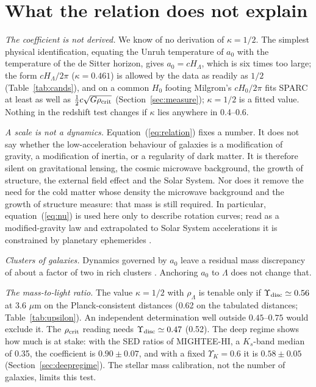 \documentclass[fleqn,usenatbib]{mnras}
\newif\ifpapersix
\begin{document}
\section{What the relation does not explain}
\label{sec:limits}
\emph{The coefficient is not derived.} We know of no derivation of $\kappa=1/2$. The simplest physical identification, equating the Unruh temperature of $a_0$ with the temperature of the de Sitter horizon, gives $a_0=cH_\Lambda$, which is six times too large; the form $cH_\Lambda/2\pi$ ($\kappa=0.461$) is allowed by the data as readily as $1/2$ (Table~\ref{tab:cands}), and on a common $H_0$ footing Milgrom's $cH_0/2\pi$ fits SPARC at least as well as $\tfrac12c\sqrt{G\rho_{\rm crit}}$ (Section~\ref{sec:measure}); $\kappa=1/2$ is a fitted value. \ifpapersix A separate analysis finds that, in the aether--scalar class of local relativistic actions it examined, the additive constant of the MOND Lagrangian is degenerate with $\Lambda$, so those actions do not fix the coefficient \citep[its four-form section is superseded]{Zimmerman2026kappa}. \fi Nothing in the redshift test changes if $\kappa$ lies anywhere in 0.4--0.6.

\emph{A scale is not a dynamics.} Equation~(\ref{eq:relation}) fixes a number. It does not say whether the low-acceleration behaviour of galaxies is a modification of gravity, a modification of inertia, or a regularity of dark matter. It is therefore silent on gravitational lensing, the cosmic microwave background, the growth of structure, the external field effect \citep{Chae2020} and the Solar System. Nor does it remove the need for the cold matter whose density the microwave background and the growth of structure measure: that mass is still required. In particular, equation~(\ref{eq:nu}) is used here only to describe rotation curves; read as a modified-gravity law and extrapolated to Solar System accelerations it is constrained by planetary ephemerides \citep{Hees2016}.

\emph{Clusters of galaxies.} Dynamics governed by $a_0$ leave a residual mass discrepancy of about a factor of two in rich clusters \citep{SandersMcGaugh2002,FamaeyMcGaugh2012}. Anchoring $a_0$ to $\Lambda$ does not change that.

\emph{The mass-to-light ratio.} The value $\kappa=1/2$ with $\rho_\Lambda$ is tenable only if $\Upsilon_{\rm disc}\simeq0.56$ at 3.6 $\mu$m on the Planck-consistent distances (0.62 on the tabulated distances; Table~\ref{tab:upsilon}). An independent determination well outside $0.45$--$0.75$ would exclude it. The $\rho_{\rm crit}$ reading needs $\Upsilon_{\rm disc}\simeq0.47$ (0.52). The deep regime shows how much is at stake: with the SED ratios of MIGHTEE-HI, a $K_s$-band median of 0.35, the coefficient is $0.90\pm0.07$, and with a fixed $\Upsilon_K=0.6$ it is $0.58\pm0.05$ (Section~\ref{sec:deepregime}). The stellar mass calibration, not the number of galaxies, limits this test.
\end{document}

